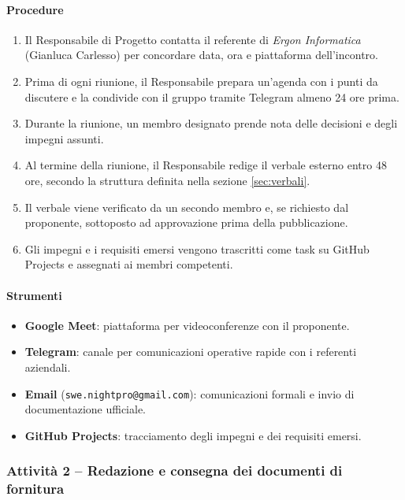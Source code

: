 \documentclass[a4paper, 11pt, oneside]{scrartcl}
\begin{document}
\paragraph{Procedure}
\begin{enumerate}
    \item Il Responsabile di Progetto contatta il referente di \textit{Ergon Informatica} (Gianluca Carlesso) per concordare data, ora e piattaforma dell'incontro.
    \item Prima di ogni riunione, il Responsabile prepara un'agenda con i punti da discutere e la condivide con il gruppo tramite Telegram almeno 24 ore prima.
    \item Durante la riunione, un membro designato prende nota delle decisioni e degli impegni assunti.
    \item Al termine della riunione, il Responsabile redige il verbale esterno entro 48 ore, secondo la struttura definita nella sezione \ref{sec:verbali}.
    \item Il verbale viene verificato da un secondo membro e, se richiesto dal proponente, sottoposto ad approvazione prima della pubblicazione.
    \item Gli impegni e i requisiti emersi vengono trascritti come task su GitHub Projects e assegnati ai membri competenti.
\end{enumerate}

\paragraph{Strumenti}
\begin{itemize}
    \item \textbf{Google Meet}: piattaforma per videoconferenze con il proponente.
    \item \textbf{Telegram}: canale per comunicazioni operative rapide con i referenti aziendali.
    \item \textbf{Email} (\texttt{swe.nightpro@gmail.com}): comunicazioni formali e invio di documentazione ufficiale.
    \item \textbf{GitHub Projects}: tracciamento degli impegni e dei requisiti emersi.
\end{itemize}

\subsubsection{Attività 2 – Redazione e consegna dei documenti di fornitura}
\end{document}
